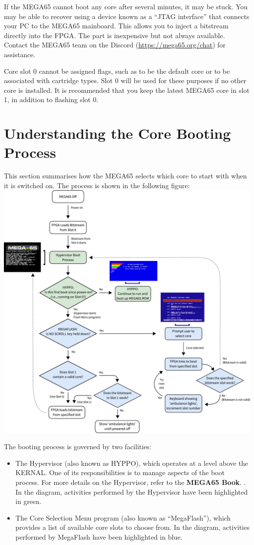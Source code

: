 If the MEGA65 cannot boot any core after several minutes, it may be stuck. You may be able to recover using a device known as a ``JTAG interface'' that connects your PC to the MEGA65 mainboard. This allows you to inject a bitstream directly into the FPGA. The part is inexpensive but not always available. Contact the MEGA65 team on the Discord (\url{https://mega65.org/chat}) for assistance.

Core slot 0 cannot be assigned flags, such as to be the default core or to be associated with cartridge types. Slot 0 will be used for these purposes if no other core is installed. It is recommended that you keep the latest MEGA65 core in slot 1, in addition to flashing slot 0.


\section{Understanding the Core Booting Process}
\nopagebreak
This section summarises how the MEGA65 selects which core to start with when it is switched on. The process is shown in the following figure:
\nopagebreak
\includegraphics[width=\linewidth]{images/illustrations/flashmenu-flowchart.pdf}

The booting process is governed by two facilities:
\begin{itemize}
  \item The Hypervisor (also known as HYPPO), which operates at a level above the KERNAL. One of its responsibilities is to manage aspects of the boot process. For more details on the Hypervisor, refer to
\ifdefined\printmanual
the {\bf MEGA65 Book}.
\else
 .
\fi
    In the diagram, activities performed by the Hypervisor have been highlighted in green.
  \item The Core Selection Menu program (also known as ``MegaFlash''), which provides a list of available core slots to choose from. In the diagram, activities performed by MegaFlash have been highlighted in blue.
\end{itemize}


